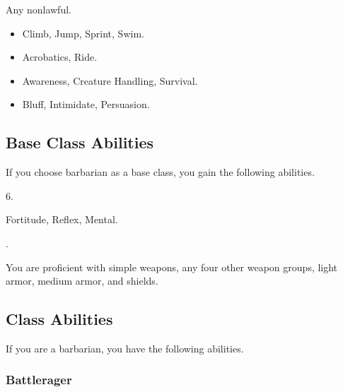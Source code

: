      Any nonlawful.

    \begin{itemize}
        \item {} Climb, Jump, Sprint, Swim.
        \item {} Acrobatics, Ride.
        \item {} Awareness, Creature Handling, Survival.
        \item {} Bluff, Intimidate, Persuasion.
    \end{itemize}

    \subsection{Base Class Abilities}
        If you choose barbarian as a base class, you gain the following abilities.

         6.

          Fortitude,  Reflex,  Mental.

         .

        You are proficient with simple weapons, any four other weapon groups, light armor, medium armor, and shields.

    \subsection{Class Abilities}
        If you are a barbarian, you have the following abilities.

        \subsubsection{Battlerager}\label{Rage}

